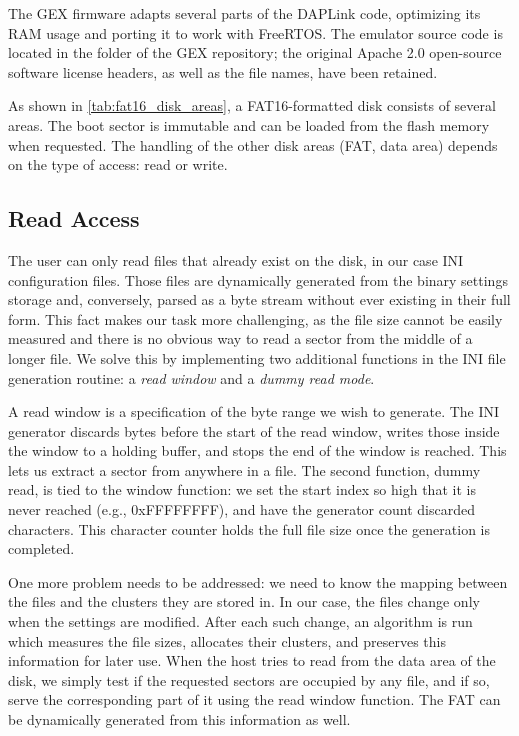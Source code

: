 The GEX firmware adapts several parts of the DAPLink code, optimizing its \gls{RAM} usage and porting it to work with FreeRTOS. The emulator source code is located in the  folder of the GEX repository; the original Apache 2.0 open-source software license headers, as well as the file names, have been retained.

As shown in \cref{tab:fat16_disk_areas}, a FAT16-formatted disk consists of several areas. The boot sector is immutable and can be loaded from the flash memory when requested. The handling of the other disk areas (\gls{FAT}, data area) depends on the type of access: read or write.

\subsection{Read Access}

The user can only read files that already exist on the disk, in our case INI configuration files. Those files are dynamically generated from the binary settings storage and, conversely, parsed as a byte stream without ever existing in their full form. This fact makes our task more challenging, as the file size cannot be easily measured and there is no obvious way to read a sector from the middle of a longer file. We solve this by implementing two additional functions in the INI file generation routine: a \textit{read window} and a \textit{dummy read mode}.

A read window is a specification of the byte range we wish to generate. The INI generator discards bytes before the start of the read window, writes those inside the window to a holding buffer, and stops the end of the window is reached. This lets us extract a sector from anywhere in a file. The second function, dummy read, is tied to the window function: we set the start index so high that it is never reached (e.g., 0xFFFFFFFF), and have the generator count discarded characters. This character counter holds the full file size once the generation is completed.

One more problem needs to be addressed: we need to know the mapping between the files and the clusters they are stored in. In our case, the files change only when the settings are modified. After each such change, an algorithm is run which measures the file sizes, allocates their clusters, and preserves this information for later use. When the host tries to read from the data area of the disk, we simply test if the requested sectors are occupied by any file, and if so, serve the corresponding part of it using the read window function. The \gls{FAT} can be dynamically generated from this information as well.


